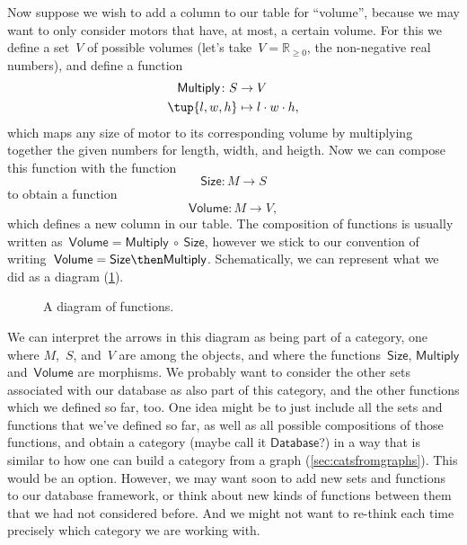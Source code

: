 Now suppose we wish to add a column to our table for ``volume'', because we may want to only consider motors that have, at most, a certain volume. For this we define a set~$V$ of possible volumes (let's take~$V = \mathbb{R}_{\geq 0}$, the non-negative real numbers), and define a function
\begin{equation*}
\begin{aligned}
\textsf{Multiply}\colon S &\to V\\
\tup{l, w, h} &\mapsto l \cdot w \cdot h,
\end{aligned}
\end{equation*}
which maps any size of motor to its corresponding volume by multiplying together the given numbers for length, width, and heigth.  Now we can compose this function with the function
\begin{equation*}
\textsf{Size}\colon M \to S
\end{equation*}
to obtain a function
\begin{equation*}
\textsf{Volume}\colon M \to V,
\end{equation*}
which defines a new column in our table. The composition of functions is usually written as~$\textsf{Volume} = \textsf{Multiply} \ \circ \ \textsf{Size}$, however we stick to our convention of writing~$\textsf{Volume} = \textsf{Size} \then \textsf{Multiply}$. Schematically, we can represent what we did as a diagram (\cref{fig:diagram_functions}).



\begin{figure}[h!]
\begin{center}
\end{center}
\caption{A diagram of functions. \label{fig:diagram_functions}}
\end{figure}

We can interpret the arrows in this diagram as being part of a category, one where $M$,~$S$, and~$V$ are among the objects, and where the functions~$\textsf{Size}$, $\textsf{Multiply}$ and~$\textsf{Volume}$ are morphisms. We probably want to consider the other sets associated with our database as also part of this category, and the other functions which we defined so far, too. One idea might be to just include all the sets and functions that we've defined so far, as well as all possible compositions of those functions, and obtain a category (maybe call it $\textsf{Database}$?) in a way that is similar to how one can build a category from a graph (\cref{sec:catsfromgraphs}). This would be an option. However, we may want soon to add new sets and functions to our database framework, or think about new kinds of functions between them that we had not considered before. And we might not want to re-think each time precisely which category we are working with.


